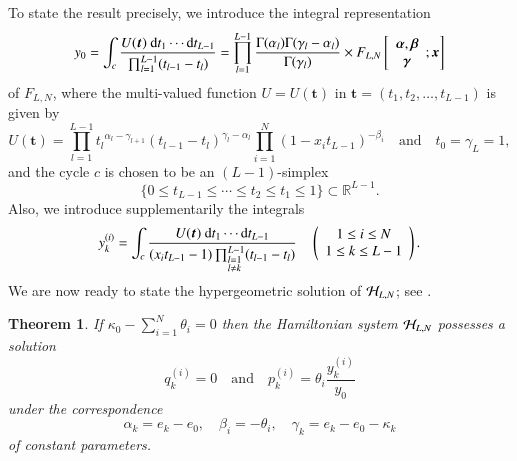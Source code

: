 \documentclass[12pt]{article}
\newtheorem{thm}{Theorem}[section]
\numberwithin{equation}{section}
\begin{document}
To state the result precisely, 
we introduce
the integral representation
\begin{equation}
\label{eq:euler}
y_0=\int_{c}
 \frac{U({\boldsymbol t}) \ 
 {\rm d}t_1 \cdots {\rm d}t_{L-1} }{ \prod_{l=1}^{L-1} (t_{l-1}-t_l)}
 = 
 \prod_{l=1}^{L-1} \frac{\Gamma(\alpha_l) \Gamma(\gamma_l-\alpha_l)}{\Gamma(\gamma_l)}
 \times F_{L,N}
\left[
\begin{array}{c}
{\boldsymbol \alpha}, {\boldsymbol \beta} \\
{\boldsymbol  \gamma}
\end{array}
; {\boldsymbol x}
\right]
\end{equation}
of $F_{L,N}$,
where 
the multi-valued function $U=U({\boldsymbol t})$ in ${\boldsymbol t}=(t_1,t_2,\ldots,t_{L-1})$
is given by
\[
U({\boldsymbol t})=
\prod_{l=1}^{L-1} {t_l}^{\alpha_l-\gamma_{l+1}}  
(t_{l-1}-t_l)^{\gamma_l-\alpha_l}
\prod_{i=1}^{N} (1-x_i t_{L-1})^{-\beta_i}
\quad \text{and} \quad t_0=\gamma_{L}=1,
\]
and the cycle $c$ is chosen to be
an $(L-1)$-simplex
\begin{equation}
\label{eq:simplex}
\{0 \leq t_{L-1} \leq \cdots \leq t_2 \leq t_1 \leq 1 \} \subset {\mathbb R}^{L-1}.
\end{equation}
Also, we introduce supplementarily
the integrals
\[
y_k^{(i)}
=\int_{c}
 \frac{U({\boldsymbol t})
 \ 
 {\rm d}t_1 \cdots {\rm d}t_{L-1} }{ 
 (x_i t_{L-1}-1)\prod_{\begin{subarray}{l} l=1 
 \\
  l \neq k \end{subarray}}^{L-1}(t_{l-1}-t_l)
 }
 \quad 
\left(
\begin{array}{c}
 1 \leq i  \leq N \\
1 \leq k \leq L-1
\end{array}
\right).
\]
We are now ready to state the hypergeometric solution of ${\cal H}_{L,N}$;
see \cite[Theorem~3.2]{tsu12b}.


\begin{thm} 
\label{thm:hgsol}
If $\kappa_0-\sum_{i=1}^N \theta_i=0$
then
the Hamiltonian system
${\cal H}_{L,N}$ 
possesses 
a solution 
\[
q_k^{(i)}=0 \quad \text{and} \quad
p_k^{(i)}
=
\theta_i\frac{y_k^{(i)}}{y_0}
\]
under the correspondence
\[
\alpha_k=e_k-e_0, \quad 
\beta_i=  - \theta_i, \quad  
\gamma_k= e_k-e_0-\kappa_k
\]
of constant parameters.
\end{thm}
\end{document}
